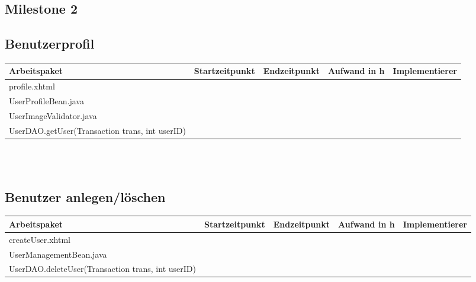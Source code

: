 \begin{landscape}
	\section{Milestone 2}
	
	\subsection{Benutzerprofil}
	\begin{tabular}{|p{10cm}|p{4cm}|p{3cm}|p{3cm}|p{3cm}|}
		\hline  \textbf{Arbeitspaket} & \textbf{Startzeitpunkt} & \textbf{Endzeitpunkt} & \textbf{Aufwand in h} & \textbf{Implementierer} \\ 
		\hline   profile.xhtml                                         &                            &                             &                     &\\
		\hline   UserProfileBean.java                                  &                            &                             &                     &\\
		\hline   UserImageValidator.java                               &                            &                             &                     &\\ 
		\hline   UserDAO.getUser(Transaction trans, int userID)        &                            &                             &                     &\\ 
		\hline 
	\end{tabular} \ \\
	\ \\
	
	\subsection{Benutzer anlegen/löschen}
	\begin{tabular}{|p{10cm}|p{4cm}|p{3cm}|p{3cm}|p{3cm}|}
		\hline  \textbf{Arbeitspaket} & \textbf{Startzeitpunkt} & \textbf{Endzeitpunkt} & \textbf{Aufwand in h} & \textbf{Implementierer} \\ 
		\hline   createUser.xhtml                                      &                            &                             &                     &\\
		\hline   UserManagementBean.java                               &                            &                             &                     &\\
		\hline   UserDAO.deleteUser(Transaction trans, int userID)     &                            &                             &                     &\\
		\hline 
	\end{tabular} \ \\
	\ \\
	

\end{landscape}
